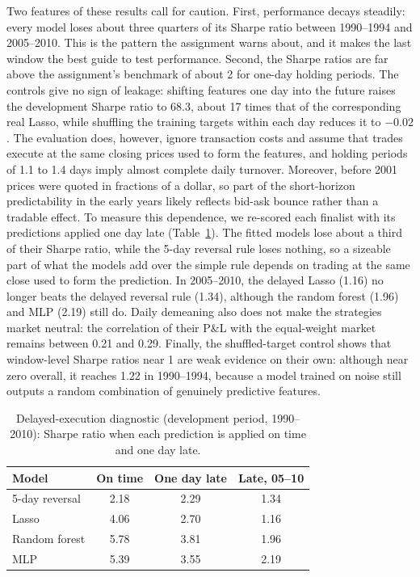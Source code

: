Two features of these results call for caution. First, performance decays steadily: every model loses about three quarters of its Sharpe ratio between 1990--1994 and 2005--2010. This is the pattern the assignment warns about, and it makes the last window the best guide to test performance. Second, the Sharpe ratios are far above the assignment's benchmark of about 2 for one-day holding periods. The controls give no sign of leakage: shifting features one day into the future raises the development Sharpe ratio to 68.3, about 17 times that of the corresponding real Lasso, while shuffling the training targets within each day reduces it to $-0.02$. The evaluation does, however, ignore transaction costs and assume that trades execute at the same closing prices used to form the features, and holding periods of 1.1 to 1.4 days imply almost complete daily turnover. Moreover, before 2001 prices were quoted in fractions of a dollar, so part of the short-horizon predictability in the early years likely reflects bid-ask bounce rather than a tradable effect. To measure this dependence, we re-scored each finalist with its predictions applied one day late (Table~\ref{tab:t3_delay}). The fitted models lose about a third of their Sharpe ratio, while the 5-day reversal rule loses nothing, so a sizeable part of what the models add over the simple rule depends on trading at the same close used to form the prediction. In 2005--2010, the delayed Lasso (1.16) no longer beats the delayed reversal rule (1.34), although the random forest (1.96) and MLP (2.19) still do. Daily demeaning also does not make the strategies market neutral: the correlation of their P\&L with the equal-weight market remains between 0.21 and 0.29. Finally, the shuffled-target control shows that window-level Sharpe ratios near 1 are weak evidence on their own: although near zero overall, it reaches 1.22 in 1990--1994, because a model trained on noise still outputs a random combination of genuinely predictive features.

\begin{table}[t]
\caption{Delayed-execution diagnostic (development period, 1990--2010): Sharpe ratio when each prediction is applied on time and one day late.}
\label{tab:t3_delay}
\centering
\small
\begin{tabular}{lccc}
\hline
Model & On time & One day late & Late, 05--10 \\
\hline
5-day reversal & 2.18 & 2.29 & 1.34 \\
Lasso          & 4.06 & 2.70 & 1.16 \\
Random forest  & 5.78 & 3.81 & 1.96 \\
MLP            & 5.39 & 3.55 & 2.19 \\
\hline
\end{tabular}
\end{table}

